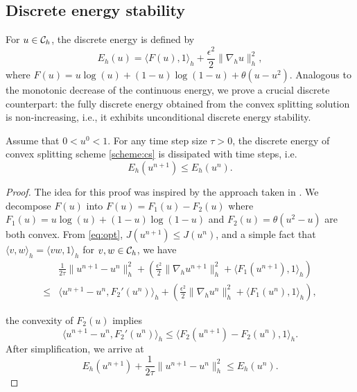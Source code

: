 \subsection{Discrete energy stability}
For $u\in {\mathcal{C}_h}$, the discrete energy is defined by
\begin{equation}
\label{eq:discrete-energy}
    E_h(u)=\langle F(u),1 \rangle_h+\frac{\epsilon^2}{2}\|\nabla_h u\|_h^2,
\end{equation}
where $F(u)=u\log(u)+(1-u)\log(1-u)+\theta(u-u^2)$. Analogous to the monotonic decrease of the continuous energy, we prove a crucial discrete counterpart: 
the fully discrete energy obtained from the convex splitting solution is non-increasing, i.e., it exhibits unconditional discrete energy stability.
\begin{theorem}\label{thm:energy-stability} 
    Assume that $0< u^0<1$. For any time step size $\tau>0$, the discrete energy of convex splitting scheme \eqref{scheme:cs} is dissipated with time steps, i.e.
    \begin{equation}
        E_h(u^{n+1})\leq E_h(u^n).
    \end{equation}
\end{theorem}
\begin{proof}
    The idea for this proof was inspired by the approach taken in \cite{eyre1998unconditionally}. 
    We decompose $F(u)$ into $F(u)=F_1(u)-F_2(u)$ where $F_1(u)=u\log(u)+(1-u)\log(1-u)$ and  $F_2(u)=\theta(u^2-u)$ are both convex. 
    From \eqref{eq:opt}, $J(u^{n+1})\leq J(u^n)$, and a simple fact that $\langle v,w \rangle_h = \langle vw,1 \rangle_h$ for $v,w \in {\mathcal{C}_h}$, we have
    \begin{equation}
        \begin{aligned}
        &\frac{1}{2\tau}\|u^{n+1}-u^n\|_h^2+(\frac{\epsilon^2}{2}\|\nabla_hu^{n+1}\|_h^2+\langle F_1(u^{n+1}),1 \rangle_h)
        \\
        \leq& \langle u^{n+1}-u^n, F_2'(u^n)\rangle_h
        +(\frac{\epsilon^2}{2}\|\nabla_hu^{n}\|_h^2+\langle F_1(u^{n}),1 \rangle_h)
        ,
    \end{aligned}
    \end{equation}
    
the convexity of $F_2(u)$ implies\begin{equation}
    \langle u^{n+1}-u^n, F_2'(u^n)\rangle_h\leq 
    \langle F_2(u^{n+1})-F_2(u^n),1 \rangle_h.
\end{equation}
    After simplification, we arrive at
\begin{equation}
    E_h(u^{n+1})+\frac{1}{2\tau}\|u^{n+1}-u^n\|_h^2\leq E_h(u^n).
\end{equation}
\end{proof}
